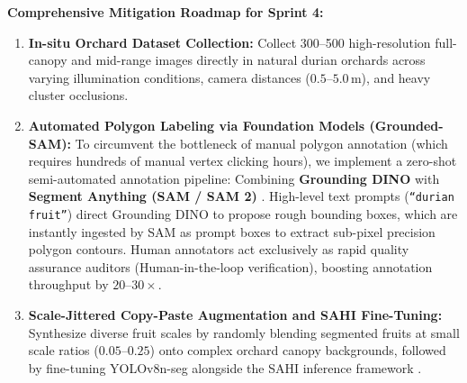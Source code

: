 \documentclass[12pt,a4paper]{article}
\begin{document}
\noindent\textbf{Comprehensive Mitigation Roadmap for Sprint 4:}
\begin{enumerate}
    \item \textbf{In-situ Orchard Dataset Collection:} Collect 300--500 high-resolution full-canopy and mid-range images directly in natural durian orchards across varying illumination conditions, camera distances ($0.5\text{--}5.0\,\text{m}$), and heavy cluster occlusions.
    \item \textbf{Automated Polygon Labeling via Foundation Models (Grounded-SAM):} To circumvent the bottleneck of manual polygon annotation (which requires hundreds of manual vertex clicking hours), we implement a zero-shot semi-automated annotation pipeline: Combining \textbf{Grounding DINO} \cite{liu2023grounding} with \textbf{Segment Anything (SAM / SAM 2)} \cite{kirillov2023segment}. High-level text prompts (\texttt{``durian fruit''}) direct Grounding DINO to propose rough bounding boxes, which are instantly ingested by SAM as prompt boxes to extract sub-pixel precision polygon contours. Human annotators act exclusively as rapid quality assurance auditors (Human-in-the-loop verification), boosting annotation throughput by $20\text{--}30\times$.
    \item \textbf{Scale-Jittered Copy-Paste Augmentation and SAHI Fine-Tuning:} Synthesize diverse fruit scales by randomly blending segmented fruits at small scale ratios ($0.05\text{--}0.25$) onto complex orchard canopy backgrounds, followed by fine-tuning YOLOv8n-seg alongside the SAHI inference framework \cite{akyon2022sahi}.
\end{enumerate}
\end{document}
